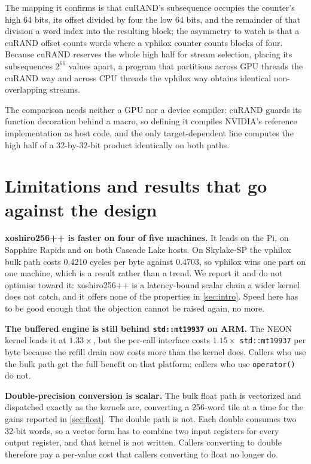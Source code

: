 \documentclass[acmsmall,screen,review]{acmart}
\theoremstyle{acmdefinition}
\newcommand{\code}[1]{\texttt{#1}}
\begin{document}
The mapping it confirms is that cuRAND's subsequence occupies the counter's high
64 bits, its offset divided by four the low 64 bits, and the remainder of that
division a word index into the resulting block; the asymmetry to watch is that a
cuRAND offset counts words where a vphilox counter counts blocks of four.
Because cuRAND reserves the whole high half for stream selection, placing its
subsequences $2^{66}$ values apart, a program that partitions across GPU threads
the cuRAND way and across CPU threads the vphilox way obtains identical
non-overlapping streams.

The comparison needs neither a GPU nor a device compiler: cuRAND guards its
function decoration behind a macro, so defining it compiles NVIDIA's reference
implementation as host code, and the only target-dependent line computes the
high half of a 32-by-32-bit product identically on both paths.

\section{Limitations and results that go against the design}\label{sec:limitations}

\textbf{xoshiro256++ is faster on four of five machines.} It leads on the Pi, on
Sapphire Rapids and on both Cascade Lake hosts. On Skylake-SP the vphilox bulk
path costs 0.4210 cycles per byte against 0.4703, so vphilox wins one part on
one machine, which is a result rather than a trend. We report it and do not
optimise toward it: xoshiro256++ is a latency-bound scalar chain a wider kernel
does not catch, and it offers none of the properties in \cref{sec:intro}. Speed
here has to be good enough that the objection cannot be raised again, no more.

\textbf{The buffered engine is still behind \code{std::mt19937} on ARM.} The
NEON kernel leads it at $1.33\times$, but the per-call interface costs
$1.15\times$ \code{std::mt19937} per byte because the refill drain now costs
more than the kernel does. Callers who use the bulk path get the full benefit
on that platform; callers who use \code{operator()} do not.

\textbf{Double-precision conversion is scalar.} The bulk float path is
vectorized and dispatched exactly as the kernels are, converting a 256-word
tile at a time for the gains reported in \cref{sec:float}. The double path is
not. Each double consumes two 32-bit words, so a vector form has to combine two
input registers for every output register, and that kernel is not written.
Callers converting to double therefore pay a per-value cost that callers
converting to float no longer do.
\end{document}
